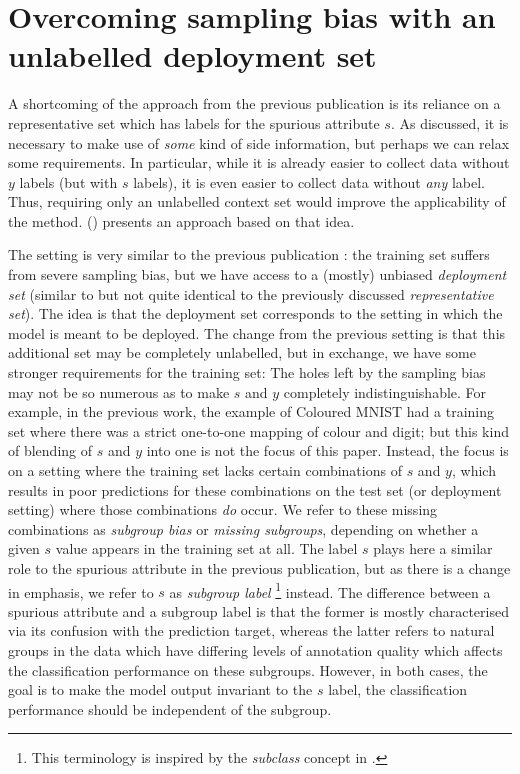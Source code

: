 \section{Overcoming sampling bias with an unlabelled deployment set}\label{sec:zsf}
A shortcoming of the approach from the previous publication \citep{kehrenberg2020nullsampling}
is its reliance on a representative set which has labels for the spurious attribute \(s\).
As discussed, it is necessary to make use of \emph{some} kind of side information,
but perhaps we can relax some requirements.
In particular, while it is already easier to collect data without \(y\) labels (but with \(s\) labels),
it is even easier to collect data without \emph{any} label.
Thus, requiring only an unlabelled context set would improve the applicability of the method.
\citet{kehrenberg2020zeroshot} () presents an approach based on that idea.

The setting is very similar to the previous publication \citep{kehrenberg2020nullsampling}:
the training set suffers from severe sampling bias, but we have access to a (mostly) unbiased \emph{deployment set}
(similar to but not quite identical to the previously discussed \emph{representative set}).
The idea is that the deployment set corresponds to the setting in which the model is meant to be deployed.
The change from the previous setting is that this additional set may be completely unlabelled,
but in exchange, we have some stronger requirements for the training set:
The holes left by the sampling bias may not be so numerous
as to make \(s\) and \(y\) completely indistinguishable.
For example, in the previous work, the example of Coloured MNIST had a training set
where there was a strict one-to-one mapping of colour and digit;
but this kind of blending of \(s\) and \(y\) into one is not the focus of this paper.
Instead, the focus is on a setting where the training set lacks certain combinations of \(s\) and \(y\),
which results in poor predictions for these combinations on the test set (or deployment setting)
where those combinations \emph{do} occur.
We refer to these missing combinations as \emph{subgroup bias} or \emph{missing subgroups},
depending on whether a given \(s\) value appears in the training set at all.
The label \(s\) plays here a similar role to the spurious attribute in the previous publication,
but as there is a change in emphasis, we refer to \(s\) as \emph{subgroup label}%
\footnote{This terminology is inspired by the \emph{subclass} concept in \citet{SohDunAngGuetal20}.}
instead.
The difference between a spurious attribute and a subgroup label is that
the former is mostly characterised via its confusion with the prediction target,
whereas the latter refers to natural groups in the data
which have differing levels of annotation quality which affects the classification performance on these subgroups.
However, in both cases, the goal is to make the model output invariant to the \(s\) label,
\ie the classification performance should be independent of the subgroup.

